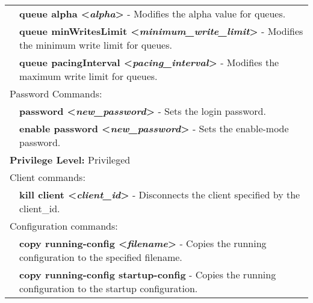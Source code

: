 \begin{tabular}{|p{10pt}p{400pt}|}
& {\bf \small queue alpha \textless\emph{alpha}\textgreater} - Modifies the alpha value for queues.\\[4pt]

& {\bf \small queue minWritesLimit \textless\emph{minimum\_write\_limit}\textgreater} - Modifies the minimum write limit for queues.\\[4pt]

& {\bf \small queue pacingInterval \textless\emph{pacing\_interval}\textgreater} - Modifies the maximum write limit for queues.\\[4pt]


\hline

\multicolumn{2}{|l|}{Password Commands:}\\

\hline

& {\bf \small password \textless\emph{new\_password}\textgreater} - Sets the login password.\\[4pt]

& {\bf \small enable password \textless\emph{new\_password}\textgreater} - Sets the enable-mode password.\\[4pt]

\hline

\hline

\multicolumn{2}{|l|}{{\bf Privilege Level:} Privileged }\\ 

\hline

\multicolumn{2}{|l|}{Client commands:}\\ 

\hline

& {\bf \small kill client \textless\emph{client\_id}\textgreater} - Disconnects the client specified by the client\_id.\\[4pt]

\hline

\multicolumn{2}{|l|}{Configuration commands:}\\ 

\hline

& {\bf \small copy running-config \textless\emph{filename}\textgreater} - Copies the running configuration to the specified filename.\\[4pt]

& {\bf \small copy running-config startup-config} - Copies the running configuration to the startup configuration.\\[4pt]


\end{tabular}
